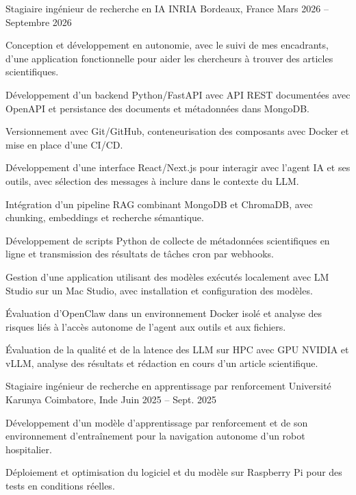 
\begin{cventries}
  \cventry
    {Stagiaire ingénieur de recherche en IA}
    {INRIA}
    {Bordeaux, France}
    {Mars 2026 -- Septembre 2026}
    {
      \begin{cvitems}
        \item {Conception et développement en autonomie, avec le suivi de mes encadrants, d’une application fonctionnelle pour aider les chercheurs à trouver des articles scientifiques.}
        \item {Développement d’un backend Python/FastAPI avec API REST documentées avec OpenAPI et persistance des documents et métadonnées dans MongoDB.}
        \item {Versionnement avec Git/GitHub, conteneurisation des composants avec Docker et mise en place d’une CI/CD.}
        \item {Développement d’une interface React/Next.js pour interagir avec l’agent IA et ses outils, avec sélection des messages à inclure dans le contexte du LLM.}
        \item {Intégration d’un pipeline RAG combinant MongoDB et ChromaDB, avec chunking, embeddings et recherche sémantique.}
        \item {Développement de scripts Python de collecte de métadonnées scientifiques en ligne et transmission des résultats de tâches cron par webhooks.}
        \item {Gestion d’une application utilisant des modèles exécutés localement avec LM Studio sur un Mac Studio, avec installation et configuration des modèles.}
        \item {Évaluation d’OpenClaw dans un environnement Docker isolé et analyse des risques liés à l’accès autonome de l’agent aux outils et aux fichiers.}
        \item {Évaluation de la qualité et de la latence des LLM sur HPC avec GPU NVIDIA et vLLM, analyse des résultats et rédaction en cours d’un article scientifique.}
      \end{cvitems}
    }

  \cventry
    {Stagiaire ingénieur de recherche en apprentissage par renforcement}
    {Université Karunya}
    {Coimbatore, Inde}
    {Juin 2025 -- Sept. 2025}
    {
      \begin{cvitems}
        \item {Développement d’un modèle d’apprentissage par renforcement et de son environnement d’entraînement pour la navigation autonome d’un robot hospitalier.}
        \item {Déploiement et optimisation du logiciel et du modèle sur Raspberry Pi pour des tests en conditions réelles.}
      \end{cvitems}
    }
\end{cventries}
